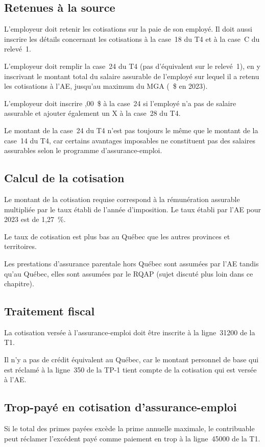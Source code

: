 \subsection{Retenues à la source}
L'employeur doit retenir les cotisations sur la paie de son employé. Il doit aussi inscrire les détails concernant les cotisations à la case~18 du T4 et à la case~C du relevé~1.

L'employeur doit remplir la case~24 du T4 (pas d'équivalent sur le relevé~1), en y inscrivant le montant total du salaire assurable de l'employé sur lequel il a retenu les cotisations à l'AE, jusqu'au maximum du MGA (~\$ en 2023). 

L'employeur doit inscrire ,00~\$ \fg{} à la case~24 si l'employé n'a pas de salaire assurable et ajouter également un \og X \fg{} à la case~28 du T4.

Le montant de la case~24 du T4 n'est pas toujours le même que le montant de la case~14 du T4, car certains avantages imposables ne constituent pas des salaires assurables selon le programme d'assurance-emploi.


\subsection{Calcul de la cotisation}
Le montant de la cotisation requise correspond à la rémunération assurable multipliée par le taux établi de l'année d'imposition. Le taux établi par l'AE pour 2023 est de 1,27~\%.

\begin{note}
	Le taux de cotisation est plus bas au Québec que les autres provinces et territoires. 
	
	Les prestations d'assurance parentale hors Québec sont assumées par l'AE tandis qu'au Québec, elles sont assumées par le RQAP (sujet discuté plus loin dans ce chapitre).
\end{note}


\subsection{Traitement fiscal}
La cotisation versée à l'assurance-emploi doit être inscrite à la ligne~31200 de la T1.

Il n'y a pas de crédit équivalent au Québec, car le montant personnel de base qui est réclamé à la ligne~350 de la TP-1 tient compte de la cotisation qui est versée à l'AE.


\subsection{Trop-payé en cotisation d'assurance-emploi}
Si le total des primes payées excède la prime annuelle maximale, le contribuable peut réclamer l'excédent payé comme paiement en trop à la ligne~45000 de la T1.

